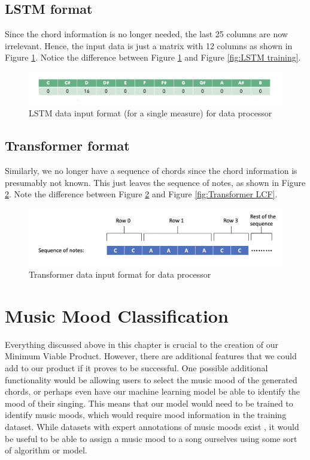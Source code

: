   \subsection{LSTM format}
Since the chord information is no longer needed, the last 25 columns are now irrelevant. Hence, the input data is just a matrix with 12 columns as shown in Figure \ref{fig:LSTM data processor}. Notice the difference between Figure \ref{fig:LSTM data processor} and Figure \ref{fig:LSTM training}.

\begin{figure}
    \centering
    \includegraphics[scale=0.3]{Figures/LSTM data processor}
    \decoRule
    \caption{LSTM data input format (for a single measure) for data processor}
    \label{fig:LSTM data processor}
    \end{figure}

\subsection{Transformer format}
Similarly, we no longer have a sequence of chords since the chord information is presumably not known. This just leaves the sequence of notes, as shown in Figure \ref{fig:Transformer data processor}. Note the difference between Figure \ref{fig:Transformer data processor} and Figure \ref{fig:Transformer LCF}.

\begin{figure}
    \centering
    \includegraphics[scale=0.3]{Figures/Transformer data processor}
    \decoRule
    \caption{Transformer data input format for data processor}
    \label{fig:Transformer data processor}
    \end{figure}

\section{Music Mood Classification}
Everything discussed above in this chapter is crucial to the creation of our Minimum Viable Product. However, there are additional features that we could add to our product if it proves to be successful. One possible additional functionality would be allowing users to select the music mood of the generated chords, or perhaps even have our machine learning model be able to identify the mood of their singing. This means that our model would need to be trained to identify music moods, which would require mood information in the training dataset. While datasets with expert annotations of music moods exist \cite{allmusic}, it would be useful to be able to assign a music mood to a song ourselves using some sort of algorithm or model.

